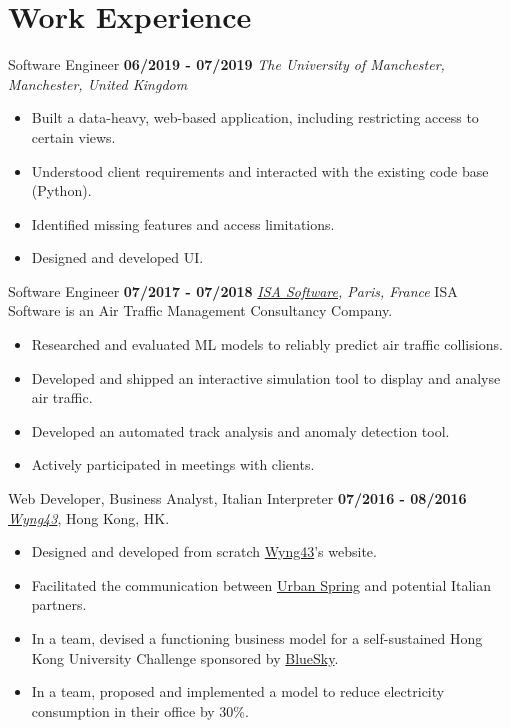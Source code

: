\documentclass[]{friggeri-cv}
\begin{document}
\section{\color{red}Work \color{gray} Experience}
\begin{entrylist}
  \entry
    {}
    {Software Engineer}
    {\textbf{06/2019 - 07/2019}}
    {\emph{{The University of Manchester}, Manchester, United Kingdom}}
    \begin{itemize}[topsep=0pt]
        \item Built a data-heavy, web-based application, including restricting access to certain views.
        \item Understood client requirements and interacted with the existing code base (Python).
        \item Identified missing features and access limitations.
        \item Designed and developed UI.
    \end{itemize}
    
\end{entrylist}
\begin{entrylist}
  \entry
    {}
    {Software Engineer}
    {\textbf{07/2017 - 07/2018}}
    {\emph{\href{https://www.isa-software.com}{ISA Software}, Paris, France}}
    ISA Software is an Air Traffic Management Consultancy Company.
    \begin{itemize}[topsep=0pt]
        \item Researched and evaluated ML models to reliably predict air traffic collisions.
        \item Developed and shipped an interactive simulation tool to display and analyse air traffic.
        \item Developed an automated track analysis and anomaly detection tool.
        \item Actively participated in meetings with clients.
    \end{itemize}
    
\end{entrylist}
\begin{entrylist}
  \entry
    {}
    {Web Developer, Business Analyst, Italian Interpreter}
    {\textbf{07/2016 - 08/2016}}
    {\emph{\href{http://www.wyng43.com/}{Wyng43}}, Hong Kong, HK}.
    \begin{itemize}
        \item Designed and developed from scratch \href{http://www.wyng43.com/}{Wyng43}'s website.
        \item Facilitated the communication between \href{http://www.urbanspring.hk/}{Urban Spring} and potential Italian partners.
        \item In a team, devised a functioning business model for a self-sustained Hong Kong University Challenge sponsored by \href{http://www.hibluesky.co/}{BlueSky}.
        \item In a team, proposed and implemented a model to reduce electricity consumption in their office by 30\%.
    \end{itemize}
\end{entrylist}
\clearpage
\newpage
\end{document}
